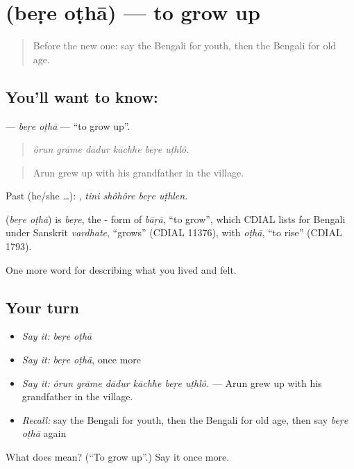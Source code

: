 \section[\texorpdfstring{\bn{বেড়ে} \bn{ওঠা} (beṛe oṭhā)}{বেড়ে ওঠা (beṛe oṭhā)}]{  (beṛe oṭhā) — to grow up}

\label{lesson:BN-C488-bere-otha}



\begin{quote}
Before the new one: say the Bengali for youth, then the Bengali for old age.
\end{quote}

\subsection*{You'll want to know:  }
\textbf{ } — \emph{beṛe oṭhā} — \textquotedblleft{}to grow up\textquotedblright{}.

\begin{quote}
     
\end{quote}

\begin{quote}
\emph{ôrun grāme dādur kāchhe beṛe uṭhlô.}
\end{quote}

\begin{quote}
Arun grew up with his grandfather in the village.
\end{quote}

Past (he/she …):    , \emph{tini shôhôre beṛe uṭhlen}.

\begin{cousinweb}
\textbf{ } (\emph{beṛe oṭhā}) is \emph{beṛe}, the - form of \emph{bāṛā}, \textquotedblleft{}to grow\textquotedblright{}, which CDIAL lists for Bengali under Sanskrit \emph{vardhate}, \textquotedblleft{}grows\textquotedblright{} (CDIAL 11376), with \emph{oṭhā}, \textquotedblleft{}to rise\textquotedblright{} (CDIAL 1793).
\end{cousinweb}

\begin{grammarlens}[title={What you've built}]
One more word for describing what you lived and felt.
\end{grammarlens}

\subsection*{Your turn}
\begin{itemize}
\raggedright
  \item \emph{Say it:} \emph{beṛe oṭhā}
  \item \emph{Say it:} \emph{beṛe oṭhā}, once more
  \item \emph{Say it:} \emph{ôrun grāme dādur kāchhe beṛe uṭhlô.} — Arun grew up with his grandfather in the village.
  \item \emph{Recall:} say the Bengali for youth, then the Bengali for old age, then say \emph{beṛe oṭhā} again
\end{itemize}

\begin{tcolorbox}[breakable,colback=teal!4,colframe=teal!35!black,title={Before you move on}]
What does   mean? (\textquotedblleft{}To grow up\textquotedblright{}.) Say it once more.
\end{tcolorbox}
